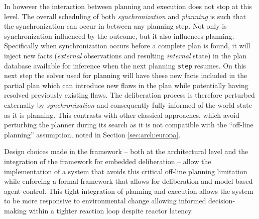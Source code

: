 In \rx however the interaction between planning and execution does not
stop at this level. The overall scheduling of both {\em
  synchronization} and {\em planning} is such that the synchronization
can occur in between any planning step. Not only is synchronization
influenced by the outcome, but it also influences planning.
Specifically when synchronization occurs before a complete plan is
found, it will inject new facts ({\em external} observations and
resulting {\em internal} state) in the plan database available for
inference when the next planning \texttt{step} resumes. On this next
step the \eu solver used for planning will have these new facts
included in the partial plan which can introduce 
new flaws in the plan while potentially having resolved previously
existing flaws. The deliberation process is therefore perturbed
externally by {\em synchronization} and consequently fully informed of
the  world state as it is planning. This contrasts
with other classical approaches, which avoid perturbing the planner
during its search as it is not compatible with the ``off-line
planning'' assumption, noted in Section \ref{sec:arch:europa}.

Design choices made in the \rx framework -- both at the architectural
level and the integration of the \eu framework for embedded
deliberation -- allow the implementation of a system that avoids this
critical off-line planning limitation while enforcing a formal
framework that allows for deliberation and model-based agent control.
This tight integration of planning and execution allows the system to
be more responsive to environmental change allowing informed
decision-making within a tighter reaction loop despite reactor
latency.








